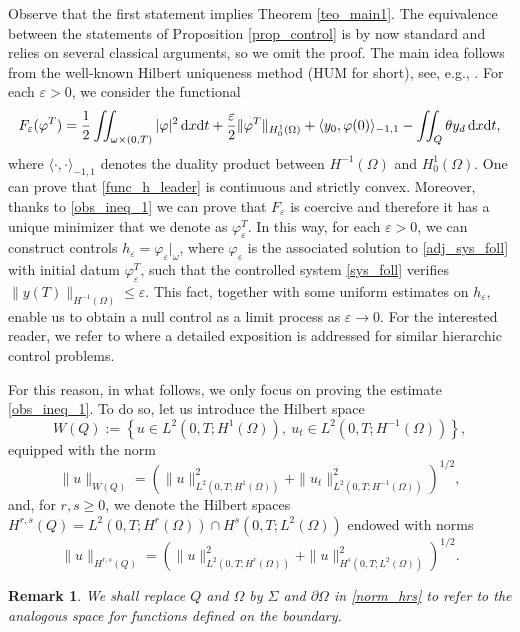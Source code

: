 \documentclass[preprint,10pt]{article}
\newtheorem{remark}[theorem]{Remark}
\numberwithin{equation}{section}
\numberwithin{theorem}{section}
\def\dx{\,\textnormal{d}x}
\def\dt{\textnormal{d}t}
\def\dx{\,\textnormal{d}x}
\def\dt{\textnormal{d}t}
\begin{document}
{Observe that the first statement implies Theorem \ref{teo_main1}. The equivalence between the statements of Proposition \ref{prop_control} is by now standard and relies on several classical arguments, so we omit the proof. The main idea follows from the well-known Hilbert uniqueness method (HUM for short), see, e.g., \cite{glo_lions_he,boyer_HUM}. For each $\varepsilon>0$, we consider the functional
%
\begin{equation}\label{func_h_leader}
F_\varepsilon(\varphi^T)=\frac{1}{2}\iint_{\omega\times(0,T)}|\varphi|^2\dx\dt+\frac{\varepsilon}{2}\|\varphi^T\|_{H_0^1(\Omega)}+\langle y_0,\varphi(0)\rangle_{-1,1}-\iint_{Q}\theta y_d\dx\dt,
\end{equation}
%
where $\langle\cdot,\cdot\rangle_{-1,1}$ denotes the duality product between $H^{-1}(\Omega)$ and $H_0^1(\Omega)$. One can prove that \eqref{func_h_leader} is continuous and strictly convex. Moreover, thanks to \eqref{obs_ineq_1} we can prove that $F_\varepsilon$ is coercive and therefore it has a unique minimizer that we denote as $\varphi_\varepsilon^T$. In this way, for each $\varepsilon>0$, we can construct controls $h_\varepsilon=\varphi_\varepsilon|_{\omega}$, where $\varphi_\varepsilon$ is the associated solution to \eqref{adj_sys_foll} with initial datum $\varphi_\varepsilon^T$, such that the controlled system \eqref{sys_foll} verifies $\|y(T)\|_{H^{-1}(\Omega)}\leq \varepsilon$. This fact, together with some uniform estimates on $h_\varepsilon$, enable us to obtain a null control as a limit process as $\varepsilon\to 0$. For the interested reader, we refer to \cite{araruna,vhs_deT_rob} where a detailed exposition is addressed for similar hierarchic control problems. 

For this reason, in what follows, we only focus on proving the estimate \eqref{obs_ineq_1}. To do so, let us introduce the Hilbert space
%
\begin{equation*}
W(Q):=\left\{u\in L^2(0,T;H^1(\Omega)), \ u_t\in L^2(0,T;H^{-1}(\Omega)) \right\},
\end{equation*}
%
equipped with the norm
%
\begin{equation*}
\|u\|_{W(Q)}=\left(\|u\|_{L^2(0,T;H^1(\Omega))}^2+\|u_t\|^2_{L^2(0,T;H^{-1}(\Omega))}\right)^{1/2},
\end{equation*}
%
and, for $r,s\geq 0$, we denote the Hilbert spaces $H^{r,s}(Q)=L^2(0,T;H^r(\Omega))\cap H^s(0,T;L^2(\Omega))$ endowed with  norms
%
\begin{equation}\label{norm_hrs}
\|u\|_{H^{r,s}(Q)}=\left(\|u\|^2_{L^2(0,T;H^r(\Omega))}+\|u\|_{H^s(0,T;L^2(\Omega))}^2\right)^{1/2}.
\end{equation}
%
\begin{remark}
We shall replace $Q$ and $\Omega$ by $\Sigma$ and $\partial\Omega$ in \eqref{norm_hrs} to refer to the analogous space for functions defined on the boundary.  
\end{remark}

}
\end{document}
